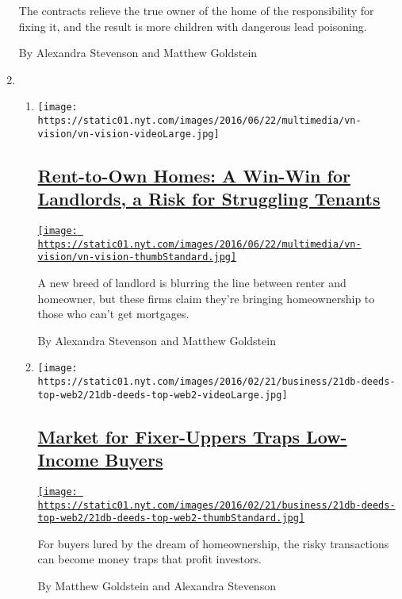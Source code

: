 \begin{enumerate}
  The contracts relieve the true owner of the home of the responsibility
  for fixing it, and the result is more children with dangerous lead
  poisoning.

  By Alexandra Stevenson and Matthew Goldstein
\item
  \begin{enumerate}
  \def\labelenumii{\arabic{enumii}.}
  \item
    \texttt{[image: https://static01.nyt.com/images/2016/06/22/multimedia/vn-vision/vn-vision-videoLarge.jpg]}

    \hypertarget{rent-to-own-homes-a-win-win-for-landlords-a-risk-for-struggling-tenants}{%
    \subsection{\texorpdfstring{\href{/2016/08/22/business/dealbook/rent-to-own-homes-a-win-win-for-landlords-a-risk-for-struggling-tenants.html}{Rent-to-Own
    Homes: A Win-Win for Landlords, a Risk for Struggling
    Tenants}}{Rent-to-Own Homes: A Win-Win for Landlords, a Risk for Struggling Tenants}}\label{rent-to-own-homes-a-win-win-for-landlords-a-risk-for-struggling-tenants}}

    \href{/2016/08/22/business/dealbook/rent-to-own-homes-a-win-win-for-landlords-a-risk-for-struggling-tenants.html}{\texttt{[image: https://static01.nyt.com/images/2016/06/22/multimedia/vn-vision/vn-vision-thumbStandard.jpg]}}

    A new breed of landlord is blurring the line between renter and
    homeowner, but these firms claim they're bringing homeownership to
    those who can't get mortgages.

    By Alexandra Stevenson and Matthew Goldstein
  \item
    \texttt{[image: https://static01.nyt.com/images/2016/02/21/business/21db-deeds-top-web2/21db-deeds-top-web2-videoLarge.jpg]}

    \hypertarget{market-for-fixer-uppers-traps-low-income-buyers}{%
    \subsection{\texorpdfstring{\href{/2016/02/21/business/dealbook/market-for-fixer-uppers-traps-low-income-buyers.html}{Market
    for Fixer-Uppers Traps Low-Income
    Buyers}}{Market for Fixer-Uppers Traps Low-Income Buyers}}\label{market-for-fixer-uppers-traps-low-income-buyers}}

    \href{/2016/02/21/business/dealbook/market-for-fixer-uppers-traps-low-income-buyers.html}{\texttt{[image: https://static01.nyt.com/images/2016/02/21/business/21db-deeds-top-web2/21db-deeds-top-web2-thumbStandard.jpg]}}

    For buyers lured by the dream of homeownership, the risky
    transactions can become money traps that profit investors.

    By Matthew Goldstein and Alexandra Stevenson
  \end{enumerate}
\end{enumerate}

